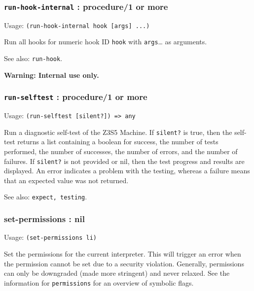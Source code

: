\documentclass[
]{article}
\newcommand{\passthrough}[1]{#1}
\begin{document}
\hypertarget{run-hook-internal-procedure1-or-more}{%
\subsubsection{\texorpdfstring{\texttt{run-hook-internal} : procedure/1
or
more}{run-hook-internal : procedure/1 or more}}\label{run-hook-internal-procedure1-or-more}}

Usage: \passthrough{\lstinline!(run-hook-internal hook [args] ...)!}

Run all hooks for numeric hook ID \passthrough{\lstinline!hook!} with
\passthrough{\lstinline!args!}\ldots{} as arguments.

See also: \passthrough{\lstinline!run-hook!}.

\textbf{Warning: Internal use only.}

\hypertarget{run-selftest-procedure1-or-more}{%
\subsubsection{\texorpdfstring{\texttt{run-selftest} : procedure/1 or
more}{run-selftest : procedure/1 or more}}\label{run-selftest-procedure1-or-more}}

Usage: \passthrough{\lstinline!(run-selftest [silent?]) => any!}

Run a diagnostic self-test of the Z3S5 Machine. If
\passthrough{\lstinline!silent?!} is true, then the self-test returns a
list containing a boolean for success, the number of tests performed,
the number of successes, the number of errors, and the number of
failures. If \passthrough{\lstinline!silent?!} is not provided or nil,
then the test progress and results are displayed. An error indicates a
problem with the testing, whereas a failure means that an expected value
was not returned.

See also: \passthrough{\lstinline!expect, testing!}.

\hypertarget{set-permissions-nil}{%
\subsubsection{set-permissions : nil}\label{set-permissions-nil}}

Usage: \passthrough{\lstinline!(set-permissions li)!}

Set the permissions for the current interpreter. This will trigger an
error when the permission cannot be set due to a security violation.
Generally, permissions can only be downgraded (made more stringent) and
never relaxed. See the information for
\passthrough{\lstinline!permissions!} for an overview of symbolic flags.
\end{document}

